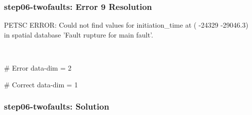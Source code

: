 \documentclass[aspectratio=169]{beamer}
\begin{document}
\begin{frame}[t,fragile]
  \frametitle{{\ttfamily step06-twofaults}: Error 9 Resolution}

  \tserror
  \begin{bashcode}
[0]PETSC ERROR: Could not find values for initiation_time at (  -24329  -29046.3) in spatial database 'Fault rupture for main fault'.
  \end{bashcode}

  \pause\\[1pt]

  \begin{cfgcode}
    # Error
    data-dim = 2
    
    # Correct
    data-dim = 1
  \end{cfgcode}

\end{frame}


\begin{frame}[fragile]
  \frametitle{{\ttfamily step06-twofaults}: Solution}

  
\end{frame}




\end{document}
